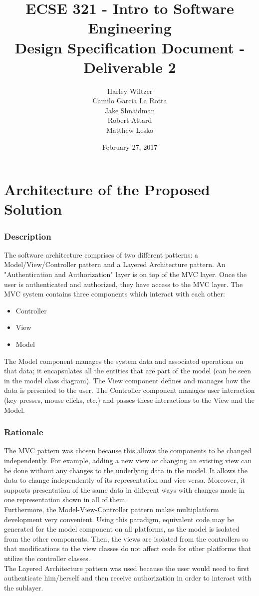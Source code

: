 \documentclass[12pt]{report}
\title{ECSE 321 - Intro to Software Engineering\\Design Specification Document - Deliverable 2}
\author{Harley Wiltzer\\Camilo Garcia La Rotta\\Jake Shnaidman\\Robert Attard\\Matthew Lesko}
\date{February 27, 2017}
\begin{document}
\maketitle
\newpage
{} %
\tableofcontents
\part{Architecture of the Proposed Solution}
\section{Description}
	The software architecture comprises of two different patterns: a Model/View/Controller pattern
	and a Layered Architecture pattern. An "Authentication and Authorization" layer is on top of the
	MVC layer. Once the user is authenticated and authorized, they have access to the MVC layer. The
	MVC system contains three components which interact with each other: 
	\begin{itemize}
		\item Controller
		\item View
		\item Model
	\end{itemize}
	The Model component manages the system data and associated operations on that data; it
	encapsulates all the entities that are part of the model (can be seen in the model class
	diagram). The View component defines and manages how the data is presented to the user. The
	Controller component manages user interaction (key presses, mouse clicks, etc.) and passes these
	interactions to the View and the Model.
\section{Rationale}
	The MVC pattern was chosen because this allows the components to be changed independently. For
	example, adding a new view or changing an existing view can be done without any changes to the
	underlying data in the model. It allows the data to change independently of its representation
	and vice versa. Moreover, it supports presentation of the same data in different ways with changes made in
	one representation shown in all of them. \\
	Furthermore, the Model-View-Controller pattern makes multiplatform development very convenient.
	Using this paradigm, equivalent code may be generated for the model component on all platforms,
	as the model is isolated from the other components. Then, the views are isolated from the
	controllers so that modifications to the view classes do not affect code for other platforms
	that utilize the controller classes.\\
	The Layered Architecture pattern was used because the user would need to first authenticate
	him/herself and then receive authorization in order to interact with the sublayer.
\end{document}
